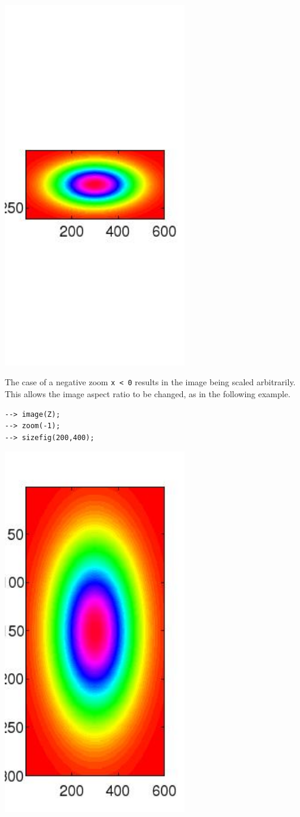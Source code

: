 \centerline{\includegraphics[width=8cm]{zoom5}}


The case of a negative zoom \verb|x < 0| results in the image being scaled arbitrarily.
This allows the image aspect ratio to be changed, as in the following example.
\begin{verbatim}
--> image(Z);
--> zoom(-1);
--> sizefig(200,400);
\end{verbatim}


\centerline{\includegraphics[width=8cm]{zoom6}}

